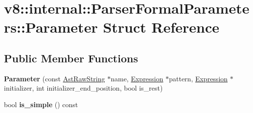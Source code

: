 \hypertarget{structv8_1_1internal_1_1_parser_formal_parameters_1_1_parameter}{}\section{v8\+:\+:internal\+:\+:Parser\+Formal\+Parameters\+:\+:Parameter Struct Reference}
\label{structv8_1_1internal_1_1_parser_formal_parameters_1_1_parameter}
\subsection*{Public Member Functions}
\begin{DoxyCompactItemize}
\item 
{\bfseries Parameter} (const \hyperlink{classv8_1_1internal_1_1_ast_raw_string}{Ast\+Raw\+String} $\ast$name, \hyperlink{classv8_1_1internal_1_1_expression}{Expression} $\ast$pattern, \hyperlink{classv8_1_1internal_1_1_expression}{Expression} $\ast$initializer, int initializer\+\_\+end\+\_\+position, bool is\+\_\+rest)\hypertarget{structv8_1_1internal_1_1_parser_formal_parameters_1_1_parameter_a315e452112d54162a69d02430ad129c7}{}\label{structv8_1_1internal_1_1_parser_formal_parameters_1_1_parameter_a315e452112d54162a69d02430ad129c7}

\item 
bool {\bfseries is\+\_\+simple} () const \hypertarget{structv8_1_1internal_1_1_parser_formal_parameters_1_1_parameter_ac7baf197a569e2d89512830aaf5863c7}{}\label{structv8_1_1internal_1_1_parser_formal_parameters_1_1_parameter_ac7baf197a569e2d89512830aaf5863c7}

\end{DoxyCompactItemize}
